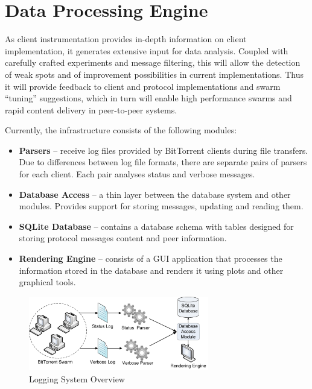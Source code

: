 \section{Data Processing Engine}
\label{sec:proto-measure:data-processing}

As client instrumentation provides in-depth information on client
implementation, it generates extensive input for data analysis. Coupled
with carefully crafted experiments and message filtering, this will allow
the detection of weak spots and of improvement possibilities in current
implementations. Thus it will provide feedback to client and protocol
implementations and swarm ``tuning'' suggestions, which in turn will enable
high performance swarms and rapid content delivery in peer-to-peer systems.

Currently, the infrastructure consists of the following modules:

\begin{itemize}
  \item \textbf{Parsers} -- receive log files provided by BitTorrent
clients during file transfers. Due to differences between log file formats,
there are separate pairs of parsers for each client. Each pair analyses status
and verbose messages.
  \item \textbf{Database Access} -- a thin layer between the database system and
other modules. Provides support for storing messages, updating and reading
them.
  \item \textbf{SQLite Database} -- contains a database schema with tables
designed for storing protocol messages content and peer information.
  \item \textbf{Rendering Engine} -- consists of a GUI application that
processes the information stored in the database and renders it using plots
and other graphical tools.
\end{itemize}

\begin{figure}[h]
  \begin{center}
    \includegraphics[width=0.7\textwidth]{src/img/proto-measure/logarch-not-use}
  \end{center}
  \caption{Logging System Overview}
  \label{fig:proto-measure:logarch}
\end{figure}

